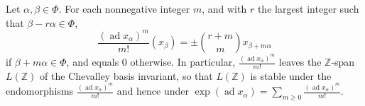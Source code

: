 Let $\alpha, \beta \in \Phi$. For each nonnegative integer $m$, and with $r$ the largest integer such that $\beta - r\alpha \in \Phi$,
$$\frac{(\operatorname{ad} x_{\alpha})^{m}}{m!}(x_{\beta}) = \pm \binom{r+m}{m} x_{\beta+m\alpha}$$
if $\beta + m\alpha \in \Phi$, and equals $0$ otherwise. In particular, $\frac{(\operatorname{ad} x_{\alpha})^{m}}{m!}$ leaves the $\mathbb{Z}$-span $L(\mathbb{Z})$ of the Chevalley basis invariant, so that $L(\mathbb{Z})$ is stable under the endomorphisms $\frac{(\operatorname{ad} x_{\alpha})^{m}}{m!}$ and hence under $\exp(\operatorname{ad} x_{\alpha}) = \sum_{m \geq 0} \frac{(\operatorname{ad} x_{\alpha})^{m}}{m!}$.
